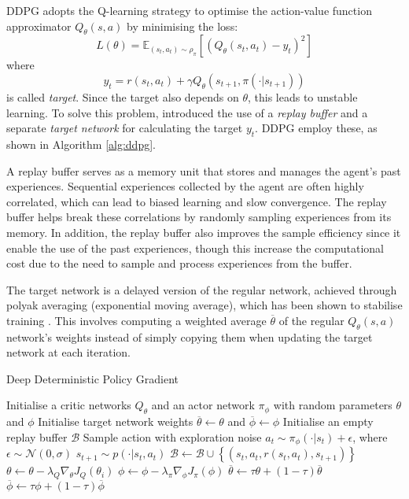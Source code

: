 {DDPG adopts the Q-learning \cite{ref:q-learning} strategy to optimise the action-value function approximator $Q_\theta(s,a)$ by minimising the loss:
\begin{displaymath}
L(\theta) = \mathbb{E}_{(s_t, a_t) \sim \rho_\pi} \left[ (Q_\theta(s_t,a_t) - y_t)^2 \right]
\end{displaymath}
where
\begin{displaymath}
y_t = r(s_t,a_t) + \gamma Q_\theta(s_{t+1},\pi(\cdot|s_{t+1}))
\end{displaymath}
is called \textit{target}. Since the target also depends on $\theta$, this leads to unstable learning. To solve this problem, \cite{ref:q-learning} introduced the use of a \textit{replay buffer} and a separate \textit{target network} for calculating the target $y_t$. DDPG employ these, as shown in Algorithm \ref{alg:ddpg}.

A replay buffer serves as a memory unit that stores and manages the agent's past experiences. Sequential experiences collected by the agent are often highly correlated, which can lead to biased learning and slow convergence. The replay buffer helps break these correlations by randomly sampling experiences from its memory. In addition, the replay buffer also improves the sample efficiency since it enable the use of the past experiences, though this increase the computational cost due to the need to sample and process experiences from the buffer.

The target network is a delayed version of the regular network, achieved through polyak averaging (exponential moving average), which has been shown to stabilise training \cite{ref:dqn-humanlevel}. This involves computing a weighted average $\overline{\theta}$ of the regular $Q_\theta(s,a)$ network's weights instead of simply copying them when updating the target network at each iteration.

\begin{algorithm}
\caption{Deep Deterministic Policy Gradient \cite{ref:ddpg}}
\label{alg:ddpg}
\begin{algorithmic}
\State Initialise a critic networks $Q_{\theta}$ and an actor network $\pi_\phi$ with random parameters $\theta$ and $\phi$
\State Initialise target network weights $\overline{\theta} \gets \theta$ and $\overline{\phi} \gets \phi$
\State Initialise an empty replay buffer $\mathcal{B}$
        \State Sample action with exploration noise $a_t \sim \pi_\phi(\cdot|s_t) + \epsilon$, where $\epsilon \sim \mathcal{N}(0,\sigma)$
        \State $s_{t+1} \sim p(\cdot|s_t,a_t)$
        \State $\mathcal{B} \gets \mathcal{B} \cup \left\{(s_t,a_t,r(s_t,a_t),s_{t+1})\right\}$
    \EndFor
        \State $\theta \gets \theta - \lambda_Q\nabla_{\theta}J_Q(\theta_i)$
        \State $\phi \gets \phi - \lambda_\pi\nabla_{\phi}J_\pi(\phi)$
        \State $\overline{\theta} \gets \tau\theta + (1-\tau)\overline{\theta}$
        \State $\overline{\phi} \gets \tau\phi + (1-\tau)\overline{\phi}$
    \EndFor
\EndFor
\end{algorithmic}
\end{algorithm}

}
